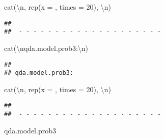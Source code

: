 \documentclass[
]{article}
\newenvironment{Shaded}{\begin{snugshade}}{\end{snugshade}}
\newcommand{\AttributeTok}[1]{\textcolor[rgb]{0.77,0.63,0.00}{#1}}
\newcommand{\DecValTok}[1]{\textcolor[rgb]{0.00,0.00,0.81}{#1}}
\newcommand{\FunctionTok}[1]{\textcolor[rgb]{0.00,0.00,0.00}{#1}}
\newcommand{\NormalTok}[1]{#1}
\newcommand{\SpecialCharTok}[1]{\textcolor[rgb]{0.00,0.00,0.00}{#1}}
\newcommand{\StringTok}[1]{\textcolor[rgb]{0.31,0.60,0.02}{#1}}
\begin{document}
\begin{Shaded}
\begin{Highlighting}[]
\FunctionTok{cat}\NormalTok{(}\StringTok{\textquotesingle{}}\SpecialCharTok{\textbackslash{}n}\StringTok{\textquotesingle{}}\NormalTok{, }\FunctionTok{rep}\NormalTok{(}\AttributeTok{x =} \StringTok{\textquotesingle{}{-}\textquotesingle{}}\NormalTok{, }\AttributeTok{times =} \DecValTok{20}\NormalTok{), }\StringTok{\textquotesingle{}}\SpecialCharTok{\textbackslash{}n}\StringTok{\textquotesingle{}}\NormalTok{)}
\end{Highlighting}
\end{Shaded}

\begin{verbatim}
## 
##  - - - - - - - - - - - - - - - - - - - -
\end{verbatim}

\begin{Shaded}
\begin{Highlighting}[]
\FunctionTok{cat}\NormalTok{(}\StringTok{\textquotesingle{}}\SpecialCharTok{\textbackslash{}n}\StringTok{qda.model.prob3:}\SpecialCharTok{\textbackslash{}n}\StringTok{\textquotesingle{}}\NormalTok{)}
\end{Highlighting}
\end{Shaded}

\begin{verbatim}
## 
## qda.model.prob3:
\end{verbatim}

\begin{Shaded}
\begin{Highlighting}[]
\FunctionTok{cat}\NormalTok{(}\StringTok{\textquotesingle{}}\SpecialCharTok{\textbackslash{}n}\StringTok{\textquotesingle{}}\NormalTok{, }\FunctionTok{rep}\NormalTok{(}\AttributeTok{x =} \StringTok{\textquotesingle{}{-}\textquotesingle{}}\NormalTok{, }\AttributeTok{times =} \DecValTok{20}\NormalTok{), }\StringTok{\textquotesingle{}}\SpecialCharTok{\textbackslash{}n}\StringTok{\textquotesingle{}}\NormalTok{)}
\end{Highlighting}
\end{Shaded}

\begin{verbatim}
## 
##  - - - - - - - - - - - - - - - - - - - -
\end{verbatim}

\begin{Shaded}
\begin{Highlighting}[]
\NormalTok{qda.model.prob3}
\end{Highlighting}
\end{Shaded}
\end{document}
